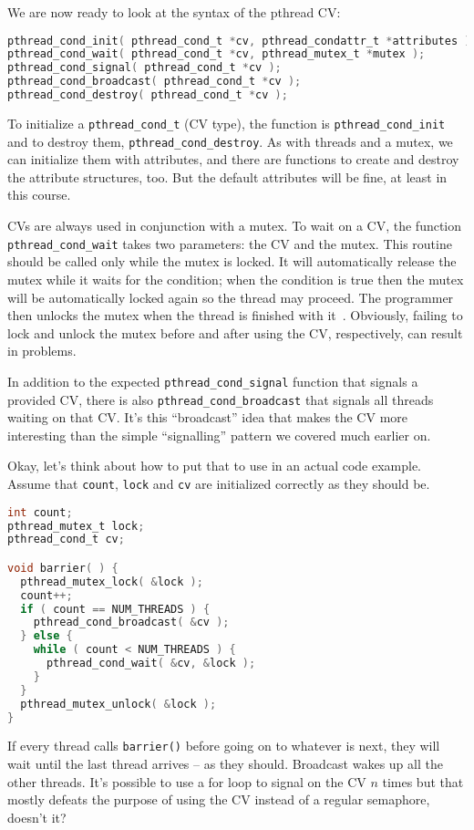 We are now ready to look at the syntax of the pthread CV:

\begin{lstlisting}[language=C]
pthread_cond_init( pthread_cond_t *cv, pthread_condattr_t *attributes );
pthread_cond_wait( pthread_cond_t *cv, pthread_mutex_t *mutex );
pthread_cond_signal( pthread_cond_t *cv );
pthread_cond_broadcast( pthread_cond_t *cv );
pthread_cond_destroy( pthread_cond_t *cv );
\end{lstlisting}

To initialize a \texttt{pthread\_cond\_t} (CV type), the function is \texttt{pthread\_cond\_init} and to destroy them, \texttt{pthread\_cond\_destroy}. As with threads and a mutex, we can initialize them with attributes, and there are functions to create and destroy the attribute structures, too. But the default attributes will be fine, at least in this course.

CVs are always used in conjunction with a mutex. To wait on a CV, the function \texttt{pthread\_cond\_wait} takes two parameters: the CV and the mutex. This routine should be called only while the mutex is locked. It will automatically release the mutex while it waits for the condition; when the condition is true then the mutex will be automatically locked again so the thread may proceed. The programmer then unlocks the mutex when the thread is finished with it~\cite{pthreads}. Obviously, failing to lock and unlock the mutex before and after using the CV, respectively, can result in problems.

In addition to the expected \texttt{pthread\_cond\_signal} function that signals a provided CV, there is also \texttt{pthread\_cond\_broadcast} that signals all threads waiting on that CV. It's this ``broadcast'' idea that makes the CV more interesting than the simple ``signalling'' pattern we covered much earlier on.

Okay, let's think about how to put that to use in an actual code example. Assume that \texttt{count}, \texttt{lock} and \texttt{cv} are initialized correctly as they should be.

\begin{lstlisting}[language=C]
int count;
pthread_mutex_t lock;
pthread_cond_t cv;

void barrier( ) {
  pthread_mutex_lock( &lock );
  count++;
  if ( count == NUM_THREADS ) {
    pthread_cond_broadcast( &cv );
  } else {
    while ( count < NUM_THREADS ) {
      pthread_cond_wait( &cv, &lock );
    }
  }
  pthread_mutex_unlock( &lock );
}
\end{lstlisting}

If every thread calls \texttt{barrier()} before going on to whatever is next, they will wait until the last thread arrives -- as they should. Broadcast wakes up all the other threads. It's possible to use a for loop to signal on the CV $n$ times but that mostly defeats the purpose of using the CV instead of a regular semaphore, doesn't it?



